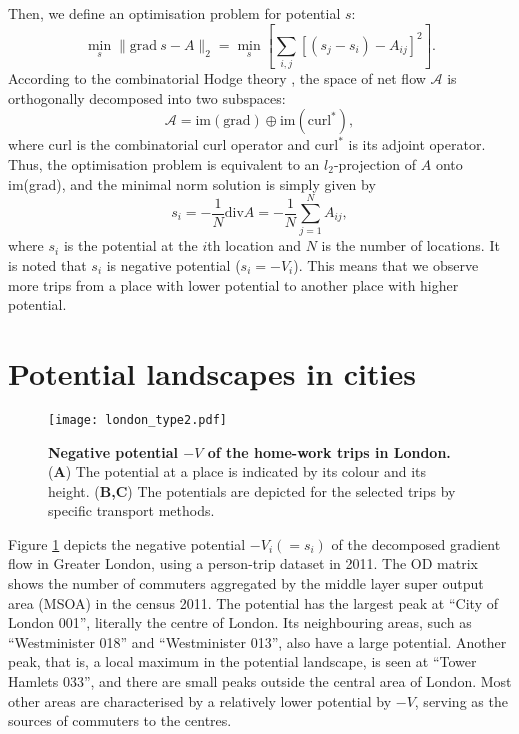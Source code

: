 \documentclass[]{article}
\begin{document}
Then, we define an optimisation problem for potential $s$:
\begin{equation}
  \min_s  \lVert   \text{grad}\ s - A \rVert_2 = \min_s \left[ \sum_{i,j} \left[ (s_j - s_i) - A_{ij} \right]^2 \right]. \label{eq:optimization_problem}
\end{equation}
According to the combinatorial Hodge theory \cite{Jiang2011}, the space of net flow $\mathcal{A}$ is orthogonally decomposed into two subspaces:
\begin{equation} 
  \mathcal{A}  = \text{im}(\text{grad})  \oplus \text{im}(\text{curl}^*),
\end{equation}
where $\text{curl}$ is the combinatorial curl operator and $\text{curl}^*$ is its adjoint operator.
%
Thus, the optimisation problem is equivalent to an $l_2$-projection of $A$ onto im(grad),
and the minimal norm solution is simply given by
\begin{equation}
  s_i = -\frac{1}{N} \text{div} A = - \frac{1}{N} \sum_{j=1}^N A_{ij}, \label{eq:potential}
\end{equation}
where $s_i$ is the potential at the $i$th location and $N$ is the number of locations. 
It is noted that $s_i$ is negative potential ($s_i=-V_i$).
This means that we observe more trips from a place with lower potential to another place with higher potential.




\section*{Potential landscapes in cities}
%
%
%
\begin{figure}[tb]
  \centering
  \texttt{[image: london\_type2.pdf]}
  \caption{
    \textbf{Negative potential $-V$ of the home-work trips in London.}
    (\textbf{A}) 
    The potential at a place is indicated by its colour and its height.
    (\textbf{B,C})
    The potentials are depicted for the selected trips by specific transport methods. 
  }
  \label{fig:PotentialLondon}
\end{figure}

Figure \ref{fig:PotentialLondon} depicts the negative potential $-V_i (=s_i)$ of the decomposed gradient flow in Greater London, using a person-trip dataset in 2011.
The OD matrix shows the number of commuters aggregated by the middle layer super output area (MSOA) in the census 2011.
The potential has the largest peak at ``City of London 001'', literally the centre of London.
Its neighbouring areas, such as ``Westminister 018'' and ``Westminister 013'', also have a large potential.
Another peak, that is, a local maximum in the potential landscape,  is seen at ``Tower Hamlets 033'',
and there are small peaks outside the central area of London.
%
Most other  areas are characterised by a relatively lower potential by $-V$, serving as the sources of commuters to the centres. 
\end{document}

